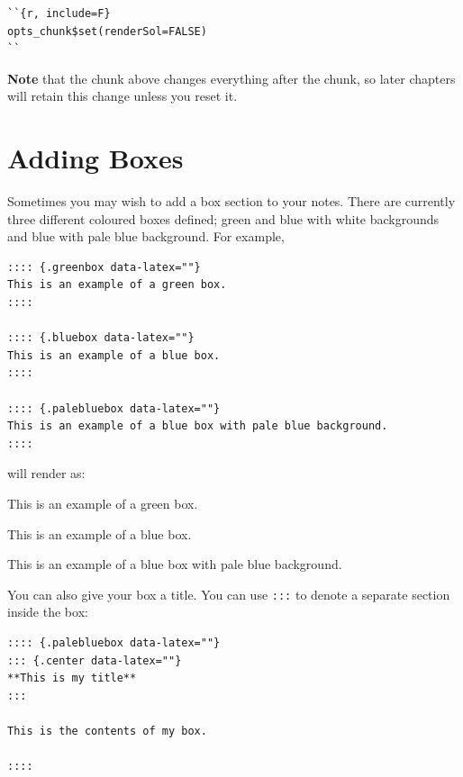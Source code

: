 \documentclass[
  british,
  oneside]{krantz}
\theoremstyle{definition}
\theoremstyle{definition}
\theoremstyle{definition}
\theoremstyle{definition}
\theoremstyle{remark}
\begin{document}
\begin{verbatim}
``{r, include=F}
opts_chunk$set(renderSol=FALSE)
``
\end{verbatim}

\textbf{Note} that the chunk above changes everything after the chunk, so later chapters will retain this change unless you reset it.

\hypertarget{adding-boxes}{%
\section{Adding Boxes}\label{adding-boxes}}

Sometimes you may wish to add a box section to your notes. There are currently three different coloured boxes defined; green and blue with white backgrounds and blue with pale blue background. For example,

\begin{verbatim}
:::: {.greenbox data-latex=""}
This is an example of a green box.
::::

:::: {.bluebox data-latex=""}
This is an example of a blue box.
::::

:::: {.palebluebox data-latex=""}
This is an example of a blue box with pale blue background.
::::
\end{verbatim}

will render as:

\begin{greenbox}
This is an example of a green box.

\end{greenbox}

\begin{bluebox}
This is an example of a blue box.

\end{bluebox}

\begin{palebluebox}
This is an example of a blue box with pale blue background.

\end{palebluebox}

You can also give your box a title. You can use \texttt{:::} to denote a separate section inside the box:

\begin{verbatim}
:::: {.palebluebox data-latex=""}
::: {.center data-latex=""}
**This is my title**
:::

This is the contents of my box.

::::
\end{verbatim}
\end{document}
